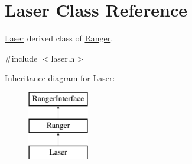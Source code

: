 \hypertarget{classLaser}{}\section{Laser Class Reference}
\label{classLaser}


\hyperlink{classLaser}{Laser} derived class of \hyperlink{classRanger}{Ranger}.  




{\ttfamily \#include $<$laser.\+h$>$}

Inheritance diagram for Laser\+:\begin{figure}[H]
\begin{center}
\leavevmode
\includegraphics[height=3.000000cm]{classLaser}
\end{center}
\end{figure}
